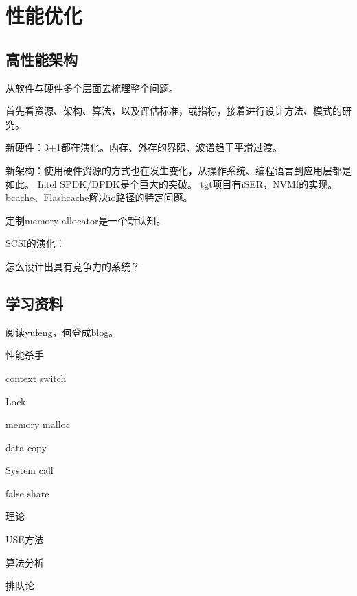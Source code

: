 \chapter{性能优化}

\section{高性能架构}

从软件与硬件多个层面去梳理整个问题。

首先看资源、架构、算法，以及评估标准，或指标，接着进行设计方法、模式的研究。

新硬件：3+1都在演化。内存、外存的界限、波谱趋于平滑过渡。

新架构：使用硬件资源的方式也在发生变化，从操作系统、编程语言到应用层都是如此。
Intel SPDK/DPDK是个巨大的突破。
tgt项目有iSER，NVMf的实现。
bcache、Flashcache解决io路径的特定问题。

定制memory allocator是一个新认知。

SCSI的演化：

怎么设计出具有竞争力的系统？

\section{学习资料}

阅读yufeng，何登成blog。

性能杀手
\begin{enumbox}
\item context switch 
\item Lock 
\item memory malloc
\item data copy
\item System call 
\item false share
\end{enumbox}

理论
\begin{enumbox}
\item USE方法
\item 算法分析
\item 排队论
\end{enumbox}

